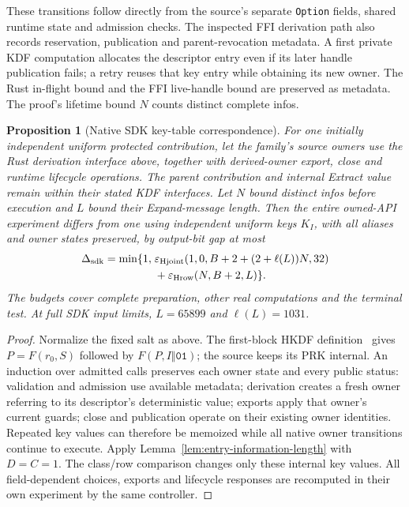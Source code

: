 \documentclass[pdflatex]{sn-jnl}
\theoremstyle{thmstyleone}
\newtheorem{proposition}[theorem]{Proposition}
\theoremstyle{thmstylethree}
\theoremstyle{thmstyletwo}
\begin{document}
These transitions follow directly from the source's separate
\texttt{Option} fields, shared runtime state and admission checks. The inspected
FFI derivation path also records reservation, publication and parent-revocation
metadata. A first private KDF computation allocates the descriptor
entry even if its later handle publication fails; a retry reuses that key
entry while obtaining its new owner. The Rust in-flight bound and the
FFI live-handle bound are preserved as metadata. The proof's lifetime bound
$N$ counts distinct complete infos.

\begin{proposition}[Native SDK key-table correspondence]
\label{prop:sdk-purpose-table}
For one initially independent uniform protected contribution, let the
family's source owners use the Rust derivation interface above, together with
derived-owner export, close and runtime lifecycle operations. The parent
contribution and internal Extract value remain within their stated KDF
interfaces. Let $N$ bound distinct infos before execution and $L$ bound their
Expand-message length. Then the entire owned-API experiment differs from
one using independent uniform keys $K_I$, with all aliases and owner states
preserved, by output-bit gap at most
\begin{equation}
\begin{split}
 \Delta_{\rm sdk}=\min\{1,\;&
 \varepsilon_{\rm Hjoint}(1,0,B+2+(2+\ell(L))N,32)\\
 &+\varepsilon_{\rm Hrow}(N,B+2,L)\}.
\end{split}
 \label{eq:sdk-purpose-error}
\end{equation}
The budgets cover complete preparation, other real computations and the
terminal test. At full SDK input limits, $L=65899$ and $\ell(L)=1031$.
\end{proposition}
\begin{proof}
Normalize the fixed salt as above. The first-block HKDF definition~\cite{rfc5869}
gives $P=F(r_0,S)$ followed by $F(P,I\Vert\mathtt{01})$; the source keeps
its PRK internal.
An induction over admitted calls preserves each owner state and every
public status: validation and admission use available metadata; derivation
creates a fresh owner referring to its descriptor's deterministic value;
exports apply that owner's current guards; close and publication operate
on their existing owner identities. Repeated key values can therefore be
memoized while all native owner transitions continue to execute.
Apply Lemma~\ref{lem:entry-information-length} with $D=C=1$.
The class/row comparison changes only these internal key values. All
field-dependent choices, exports and lifecycle responses are recomputed
in their own experiment by the same controller.
\end{proof}
\end{document}
